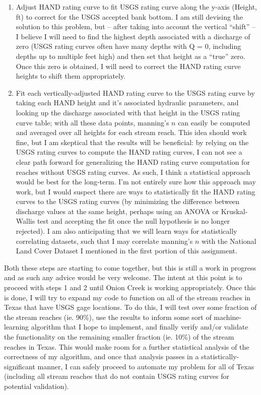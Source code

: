 \documentclass[11pt]{article}
\begin{document}
\begin{enumerate}
  \item Adjust HAND rating curve to fit USGS rating curve along the y-axis (Height, ft) to correct for the USGS accepted bank bottom. I am still devising the solution to this problem, but -- after taking into account the vertical ``shift'' -- I believe I will need to find the highest depth associated with a discharge of zero (USGS rating curves often have many depths with Q = 0, including depths up to multiple feet high) and then set that height as a ``true'' zero. Once this zero is obtained, I will need to correct the HAND rating curve heights to shift them appropriately. 
  \vspace{1ex}
  \item Fit each vertically-adjusted HAND rating curve to the USGS rating curve by taking each HAND height and it's associated hydraulic parameters, and looking up the discharge associated with that height in the USGS rating curve table; with all these data points, manning's $n$ can easily be computed and averaged over all heights for each stream reach. This idea should work fine, but I am skeptical that the results will be beneficial: by relying on the USGS rating curves to compute the HAND rating curves, I can not see a clear path forward for generalizing the HAND rating curve computation for reaches without USGS rating curves. As such, I think a statistical approach would be best for the long-term. I'm not entirely sure how this approach may work, but I would suspect there are ways to statistically fit the HAND rating curves to the USGS rating curves (by minimizing the difference between discharge values at the same height, perhaps using an ANOVA or Kruskal-Wallis test and accepting the fit once the null hypothesis is no longer rejected). I am also anticipating that we will learn ways for statistically correlating datasets, such that I may correlate manning's $n$ with the National Land Cover Dataset I mentioned in the first portion of this assignment. 
\end{enumerate}

Both these steps are starting to come together, but this is still a work in progress and as such any advice would be very welcome. The intent at this point is to proceed with steps 1 and 2 until Onion Creek is working appropriately. Once this is done, I will try to expand my code to function on all of the stream reaches in Texas that have USGS gage locations. To do this, I will test over some fraction of the stream reaches (ie. 90\%), use the results to inform some sort of machine-learning algorithm that I hope to implement, and finally verify and/or validate the functionality on the remaining smaller fraction (ie. 10\%) of the stream reaches in Texas. This would make room for a further statistical analysis of the correctness of my algorithm, and once that analysis passes in a statistically-significant manner, I can safely proceed to automate my problem for all of Texas (including all stream reaches that do not contain USGS rating curves for potential validation). \\
\end{document}
